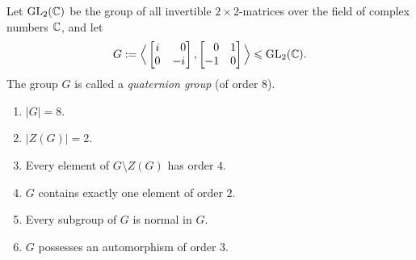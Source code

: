 \begin{exr}
    Let\/ $\text{GL}_2(\mathbb{C})$ be the group of all invertible\/ $2\times2$-matrices over the field of complex numbers\/ $\mathbb{C}$, and let
    $$
        G := \Big\langle\begin{bmatrix}
            i   & \hphantom-0\\
            0 & -i
        \end{bmatrix},
        \begin{bmatrix}
            \hphantom-0 & 1\\
            -1  &0
        \end{bmatrix}\Big\rangle\subgroup \text{GL}_2(\C).
    $$
    The group\/ $G$ is called a \textsl{quaternion group} (of order\/ $8$).
    \begin{enumerate}[\rm a)]
        \item $|G| = 8$.
        \item $|Z(G)| = 2$.
        \item Every element of\/ $G \setminus Z(G)$ has order\/ $4$.
        \item $G$ contains exactly one element of order\/ $2$.
        \item Every subgroup of\/ $G$ is normal in\/ $G$.
        \item $G$ possesses an automorphism of order\/ $3$.
    \end{enumerate}
\end{exr}

